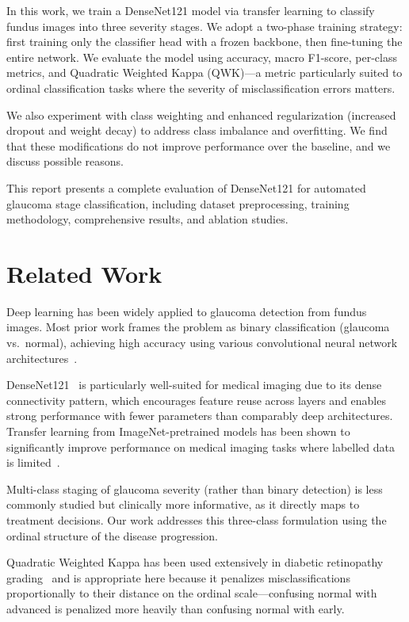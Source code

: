 \documentclass[conference]{IEEEtran}
\begin{document}
In this work, we train a DenseNet121 model via transfer learning to classify fundus images into three severity stages.
We adopt a two-phase training strategy: first training only the classifier head with a frozen backbone, then fine-tuning the entire network.
We evaluate the model using accuracy, macro F1-score, per-class metrics, and Quadratic Weighted Kappa (QWK)---a metric particularly suited to ordinal classification tasks where the severity of misclassification errors matters.

We also experiment with class weighting and enhanced regularization (increased dropout and weight decay) to address class imbalance and overfitting.
We find that these modifications do not improve performance over the baseline, and we discuss possible reasons.

This report presents a complete evaluation of DenseNet121 for automated glaucoma stage classification, including dataset preprocessing, training methodology, comprehensive results, and ablation studies.

\section{Related Work}
\label{sec:related}

Deep learning has been widely applied to glaucoma detection from fundus images.
Most prior work frames the problem as binary classification (glaucoma vs.\ normal), achieving high accuracy using various convolutional neural network architectures~\cite{li2018efficacy}.

DenseNet121~\cite{huang2017densely} is particularly well-suited for medical imaging due to its dense connectivity pattern, which encourages feature reuse across layers and enables strong performance with fewer parameters than comparably deep architectures.
Transfer learning from ImageNet-pretrained models has been shown to significantly improve performance on medical imaging tasks where labelled data is limited~\cite{raghu2019transfusion}.

Multi-class staging of glaucoma severity (rather than binary detection) is less commonly studied but clinically more informative, as it directly maps to treatment decisions.
Our work addresses this three-class formulation using the ordinal structure of the disease progression.

Quadratic Weighted Kappa has been used extensively in diabetic retinopathy grading~\cite{kaggle2015dr} and is appropriate here because it penalizes misclassifications proportionally to their distance on the ordinal scale---confusing normal with advanced is penalized more heavily than confusing normal with early.
\end{document}
